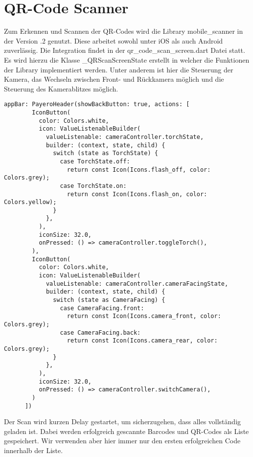 \section{QR-Code Scanner}

Zum Erkennen und Scannen der QR-Codes wird die Library \glqq mobile\_scanner\grqq{} in der Version .2\grqq{} genutzt.
Diese arbeitet sowohl unter iOS als auch Android zuverlässig.
Die Integration findet in der \glqq qr\_code\_scan\_screen.dart\grqq{} Datei statt.
Es wird hierzu die Klasse \glqq \_QRScanScreenState\grqq{} erstellt in welcher die Funktionen der Library implementiert werden.
Unter anderem ist hier die Steuerung der Kamera, das Wechseln zwischen Front- und Rückkamera möglich und die Steuerung des Kamerablitzes möglich.

\begin{lstlisting}[caption=Kamerasteuerung, label=cam_ctrl]
	appBar: PayeroHeader(showBackButton: true, actions: [
        IconButton(
          color: Colors.white,
          icon: ValueListenableBuilder(
            valueListenable: cameraController.torchState,
            builder: (context, state, child) {
              switch (state as TorchState) {
                case TorchState.off:
                  return const Icon(Icons.flash_off, color: Colors.grey);
                case TorchState.on:
                  return const Icon(Icons.flash_on, color: Colors.yellow);
              }
            },
          ),
          iconSize: 32.0,
          onPressed: () => cameraController.toggleTorch(),
        ),
        IconButton(
          color: Colors.white,
          icon: ValueListenableBuilder(
            valueListenable: cameraController.cameraFacingState,
            builder: (context, state, child) {
              switch (state as CameraFacing) {
                case CameraFacing.front:
                  return const Icon(Icons.camera_front, color: Colors.grey);
                case CameraFacing.back:
                  return const Icon(Icons.camera_rear, color: Colors.grey);
              }
            },
          ),
          iconSize: 32.0,
          onPressed: () => cameraController.switchCamera(),
        )
      ])
\end{lstlisting}

Der Scan wird kurzen Delay gestartet, um sicherzugehen, dass alles vollständig geladen ist.
Dabei werden erfolgreich gescannte Barcodes und QR-Codes als Liste gespeichert.
Wir verwenden aber hier immer nur den ersten erfolgreichen Code innerhalb der Liste.

